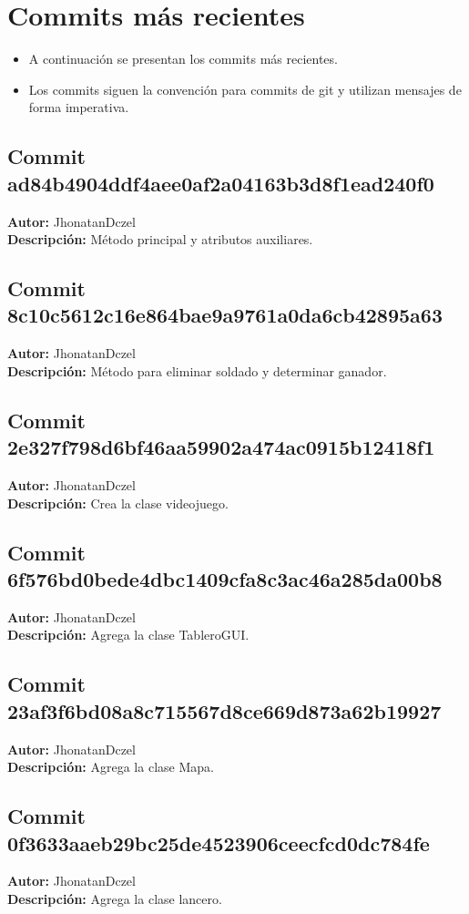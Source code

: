 \section{Commits más recientes}
\begin{itemize}
    \item A continuación se presentan los commits más recientes.
    \item Los commits siguen la convención para commits de git y utilizan mensajes de forma imperativa.
\end{itemize}

\subsection*{Commit ad84b4904ddf4aee0af2a04163b3d8f1ead240f0}
\textbf{Autor:} JhonatanDczel \\
\textbf{Descripción:} Método principal y atributos auxiliares.

\subsection*{Commit 8c10c5612c16e864bae9a9761a0da6cb42895a63}
\textbf{Autor:} JhonatanDczel \\
\textbf{Descripción:} Método para eliminar soldado y determinar ganador.

\subsection*{Commit 2e327f798d6bf46aa59902a474ac0915b12418f1}
\textbf{Autor:} JhonatanDczel \\
\textbf{Descripción:} Crea la clase videojuego.

\subsection*{Commit 6f576bd0bede4dbc1409cfa8c3ac46a285da00b8}
\textbf{Autor:} JhonatanDczel \\
\textbf{Descripción:} Agrega la clase TableroGUI.

\subsection*{Commit 23af3f6bd08a8c715567d8ce669d873a62b19927}
\textbf{Autor:} JhonatanDczel \\
\textbf{Descripción:} Agrega la clase Mapa.

\subsection*{Commit 0f3633aaeb29bc25de4523906ceecfcd0dc784fe}
\textbf{Autor:} JhonatanDczel \\
\textbf{Descripción:} Agrega la clase lancero.

